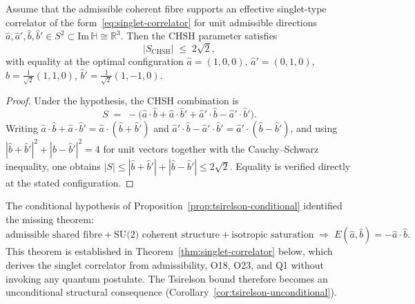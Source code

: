     \begin{proposition}
      \label{prop:tsirelson-conditional}
      Assume that the admissible coherent fibre supports an effective singlet-type
      correlator of the form~\eqref{eq:singlet-correlator} for unit admissible
      directions $\hat{a}, \hat{a}', \hat{b}, \hat{b}' \in S^2 \subset
      \mathrm{Im}\,\mathbb{H} \cong \mathbb{R}^3$.
      Then the CHSH parameter satisfies
      \begin{equation}
        |S_{\mathrm{CHSH}}| \;\leq\; 2\sqrt{2},
      \end{equation}
      with equality at the optimal configuration
      $\hat{a} = (1,0,0)$, $\hat{a}' = (0,1,0)$,
      $\hat{b} = \tfrac{1}{\sqrt{2}}(1,1,0)$,
      $\hat{b}' = \tfrac{1}{\sqrt{2}}(1,-1,0)$.
    \end{proposition}

    \begin{proof}
      Under the hypothesis, the CHSH combination is
      \[
        S \;=\; -\bigl(
        \hat{a}\cdot\hat{b}
        + \hat{a}\cdot\hat{b}'
        + \hat{a}'\cdot\hat{b}
        - \hat{a}'\cdot\hat{b}'
        \bigr).
      \]
      Writing $\hat{a}\cdot\hat{b} + \hat{a}\cdot\hat{b}'
      = \hat{a}\cdot(\hat{b}+\hat{b}')$ and
      $\hat{a}'\cdot\hat{b} - \hat{a}'\cdot\hat{b}'
      = \hat{a}'\cdot(\hat{b}-\hat{b}')$,
      and using $|\hat{b}+\hat{b}'|^2 + |\hat{b}-\hat{b}'|^2 = 4$
      for unit vectors together with the Cauchy--Schwarz inequality, one obtains
      $|S| \leq |\hat{b}+\hat{b}'| + |\hat{b}-\hat{b}'| \leq 2\sqrt{2}$.
      Equality is verified directly at the stated configuration.
    \end{proof}

    \begin{remark}
      \label{rem:open-singlet}
      The conditional hypothesis of Proposition~\ref{prop:tsirelson-conditional}
      identified the missing theorem:
      \begin{equation*}
        \text{admissible shared fibre}
        + \text{SU(2) coherent structure}
        + \text{isotropic saturation}
        \;\Longrightarrow\;
        E(\hat{a},\hat{b}) = -\hat{a}\cdot\hat{b}.
      \end{equation*}
      This theorem is established in Theorem~\ref{thm:singlet-correlator} below,
      which derives the singlet correlator from admissibility, O18, O23, and Q1
      without invoking any quantum postulate.
      The Tsirelson bound therefore becomes an unconditional structural consequence
      (Corollary~\ref{cor:tsirelson-unconditional}).
    \end{remark}

